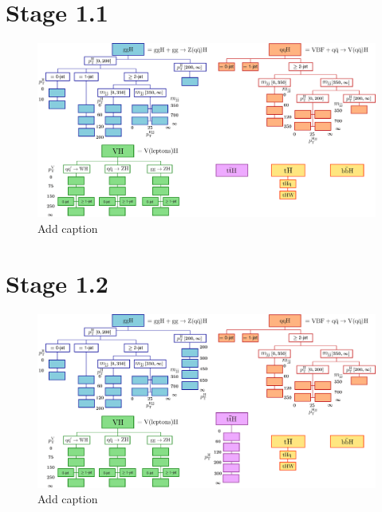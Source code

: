 \section{Stage 1.1}
\begin{figure}[htb!]
  \centering
  \includegraphics[width=1\linewidth]{Figures/app_merging_schemes/stage1p1.pdf}
  \caption[Schematic of the STXS stage 1.1 binning scheme]
  {
    Add caption
  }
  \label{fig:stxs_schematic_stage1p1}
\end{figure}

\FloatBarrier
\section{Stage 1.2}
\begin{figure}[htb!]
  \centering
  \includegraphics[width=1\linewidth]{Figures/app_merging_schemes/stage1p2.pdf}
  \caption[Schematic of the STXS stage 1.2 binning scheme]
  {
    Add caption
  }
  \label{fig:stxs_schematic_stage1p2}
\end{figure}
